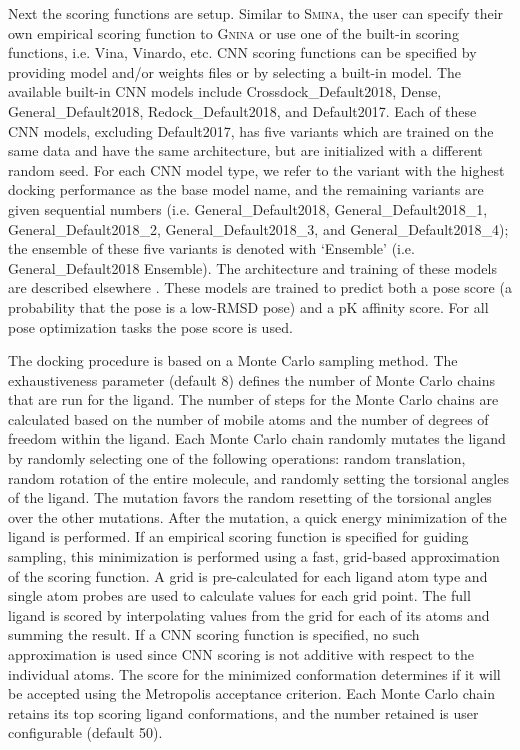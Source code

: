 \documentclass[journal=jcisd8,manuscript=article]{achemso}
\begin{document}
Next the scoring functions are setup. Similar to \textsc{Smina}, the user can specify their own empirical scoring function to \textsc{Gnina} or use one of the built-in scoring functions, i.e. Vina, Vinardo\cite{quiroga2016vinardo}, etc. CNN scoring functions can be specified by providing model and/or weights files or by selecting a built-in model.  The available built-in CNN models include Crossdock\_Default2018, Dense, General\_Default2018, Redock\_Default2018, and Default2017. Each of these CNN models, excluding Default2017, has five variants which are trained on the same data and have the same architecture, but are initialized with a different random seed. For each CNN model type, we refer to the variant with the highest docking performance as the base model name, and the remaining variants are given sequential numbers (i.e. General\_Default2018, General\_Default2018\_1, General\_Default2018\_2, General\_Default2018\_3, and General\_Default2018\_4); the ensemble of these five variants is denoted with `Ensemble' (i.e. General\_Default2018 Ensemble). The architecture and training of these models are described elsewhere \cite{francoeur2020three,Ragoza2017}. These models are trained to predict both a pose score (a probability that the pose is a low-RMSD pose) and a pK affinity score.  For all pose optimization tasks the pose score is used.

The docking procedure is based on a Monte Carlo sampling method. The exhaustiveness parameter (default $8$) defines the number of Monte Carlo chains that are run for the ligand. The number of steps for the Monte Carlo chains are calculated based on the number of mobile atoms and the number of degrees of freedom within the ligand. Each Monte Carlo chain randomly mutates the ligand by randomly selecting one of the following operations: random translation, random rotation of the entire molecule, and randomly setting the torsional angles of the ligand. The mutation favors the random resetting of the torsional angles over the other mutations. After the mutation, a quick energy minimization of the ligand is performed.  If an empirical scoring function is specified for guiding sampling, this minimization is performed using a fast, grid-based approximation of the scoring function.  A grid is pre-calculated for each ligand atom type and single atom probes are used to calculate values for each grid point.  The full ligand is scored by interpolating values from the grid for each of its atoms and summing the result.  If a CNN scoring function is specified, no such approximation is used since CNN scoring is not additive with respect to the individual atoms\cite{hochuli2018visualizing}.
 The score for the minimized conformation determines if it will be accepted using the Metropolis acceptance criterion. Each Monte Carlo chain retains its top scoring  ligand conformations, and the number retained is user configurable (default 50).
\end{document}
